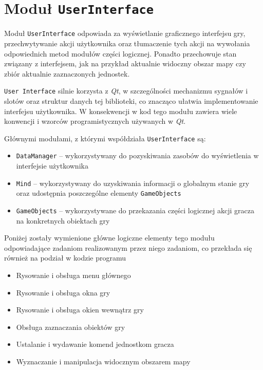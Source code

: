 \documentclass[licencjacka]{pracamgr}
\begin{document}
  \section{Moduł \texttt{UserInterface}}
    Moduł \texttt{UserInterface} odpowiada za wyświetlanie graficznego interfejsu gry, przechwytywanie akcji użytkownika
    oraz tłumaczenie tych akcji na wywołania odpowiednich metod modułów części logicznej. Ponadto przechowuje stan związany
    z interfejsem, jak na przykład aktualnie widoczny obszar mapy czy zbiór aktualnie zaznaczonych jednostek.

    \texttt{User Interface} silnie korzysta z \emph{Qt}, w szczególności mechanizmu sygnałów i slotów oraz struktur danych
    tej biblioteki, co znacząco ułatwia implementowanie interfejsu użytkownika. W konsekwencji w kod tego modułu zawiera wiele
    konwencji i wzorców programistycznych używanych w \emph{Qt}.

    Głównymi modułami, z którymi współdziała \texttt{UserInterface} są:
    \begin{itemize}
     \item \texttt{DataManager} -- wykorzystywany do pozyskiwania zasobów do wyświetlenia w interfejsie użytkownika
     \item \texttt{Mind} -- wykorzystywany do uzyskiwania informacji o globalnym stanie gry oraz udostępnia poszczególne elementy \texttt{GameObjects}
     \item \texttt{GameObjects} -- wykorzystywane do przekazania części logicznej akcji gracza na konkretnych obiektach gry
    \end{itemize}

    Poniżej zostały wymienione główne logiczne elementy tego modułu odpowiadające zadaniom realizowanym przez niego zadaniom,
    co przekłada się również na podział w kodzie programu

    \begin{itemize}
     \item Rysowanie i obsługa menu głównego
     \item Rysowanie i obsługa okna gry
     \item Rysowanie i obsługa okien wewnątrz gry
     \item Obsługa zaznaczania obiektów gry
     \item Ustalanie i wydawanie komend jednostkom gracza
     \item Wyznaczanie i manipulacja widocznym obszarem mapy
    \end{itemize}
\end{document}
